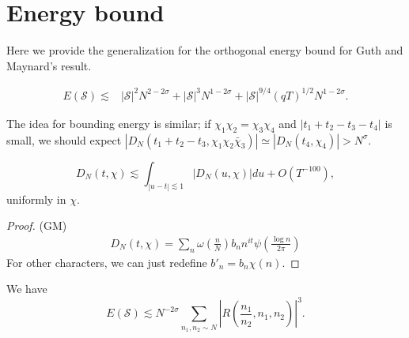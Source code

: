 
\section{Energy bound}
Here we provide the generalization for the orthogonal energy bound for Guth and Maynard's result. 
\begin{proposition}\label{energybound}
    \begin{align*}
        E(\mathcal{S})
        \lesssim& |\mathcal{S}|^2N^{2-2\sigma}+ |\mathcal{S}|^3N^{1-2\sigma} + |\mathcal{S}|^{9/4}(qT)^{1/2}N^{{1-2\sigma}}.
    \end{align*}
\end{proposition}
The idea for bounding energy is similar; if $\chi_1\chi_2=\chi_3\chi_4$ and $|t_1+t_2-t_3-t_4|$ is small, we should expect $|D_N(t_1+t_2-t_3,\chi_1\chi_2\bar{\chi}_3)|\simeq |D_N(t_4,\chi_4)|>N^\sigma$.
\begin{lemma}
    \[
    D_N(t,\chi)\lesssim \int_{|u-t|\lesssim 1} |D_N(u,\chi)|du + O(T^{-100}),
    \]
    uniformly in $\chi$.
\end{lemma}
\begin{proof}
    (GM)
    \begin{align*}
        D_N(t,\chi)=\sum_n \omega\left(\frac{n}{N}\right) b_n n^{it} \psi\left(\frac{\log n}{2\pi}\right)
    \end{align*}
    For other characters, we can just redefine $b'_n=b_n\chi(n)$.
\end{proof}
\begin{lemma} We have \[
    E(\mathcal{S})\lesssim N^{-2\sigma}\sum_{n_1,n_2\sim N}\left|R\left(\frac{n_1}{n_2},n_1,n_2\right) \right|^3.
    \]
    
\end{lemma}
